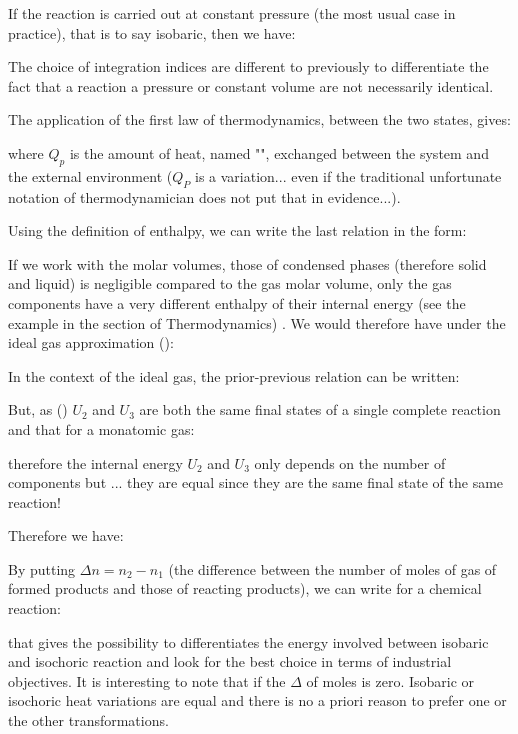 	If the reaction is carried out at constant pressure (the most usual case in practice), that is to say isobaric, then we have:
	
	\begin{tcolorbox}[title=Remark,colframe=black,arc=10pt]
	The choice of integration indices are different to previously to differentiate the fact that a reaction a pressure or constant volume are not necessarily identical.
	\end{tcolorbox}
	
	The application of the first law of thermodynamics, between the two states, gives:
	
	where $Q_p$ is the amount of heat, named "", exchanged between the system and the external environment ($Q_P$ is a variation... even if the traditional unfortunate notation of thermodynamician does not put that in evidence...).
	
	Using the definition of enthalpy, we can write the last relation in the form:
	
	If we work with the molar volumes, those of condensed phases (therefore solid and liquid) is negligible compared to the gas molar volume, only the gas components have a very different enthalpy of their internal energy (see the example in the section of Thermodynamics) . We would therefore have under the ideal gas approximation ():
	
	In the context of the ideal gas, the prior-previous relation can be written:
	
	But, as () $U_2$ and $U_3$ are both the same final states of a single complete reaction and that for a monatomic gas:
	
	therefore the internal energy $U_2$ and $U_3$ only depends on the number of components but ... they are equal since they are the same final state of the same reaction!
	
	Therefore we have:
	
	By putting $\Delta n=n_2-n_1$ (the difference between the number of moles of gas of formed products and those of reacting products), we can write for a chemical reaction:
	
	that gives the possibility to differentiates the energy involved between isobaric and isochoric reaction and look for the best choice in terms of industrial objectives. It is interesting to note that if the $\Delta$ of moles is zero. Isobaric or isochoric heat variations are equal and there is no a priori reason to prefer one or the other transformations.
	
